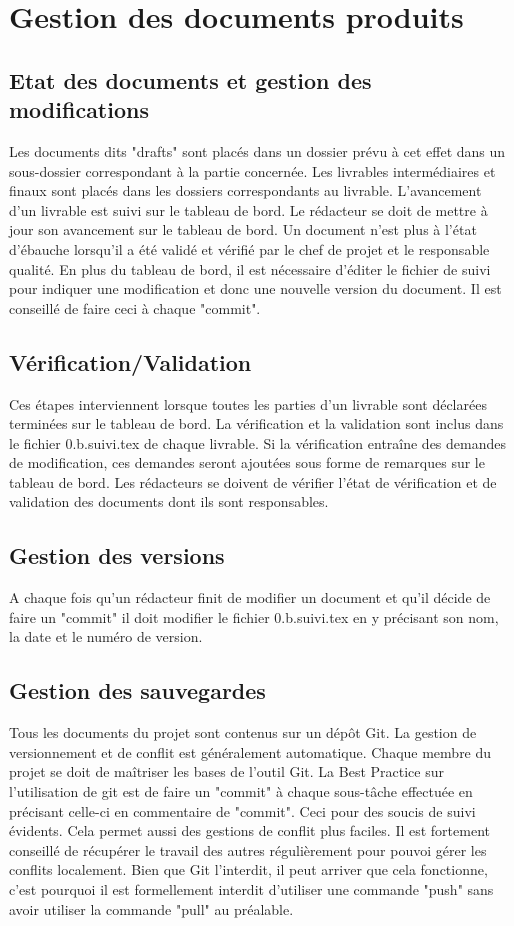\section{Gestion des documents produits}
\subsection{Etat des documents et gestion des modifications}
Les documents dits "drafts" sont placés dans un dossier prévu à cet effet dans
un sous-dossier correspondant à la partie concernée. 
Les livrables intermédiaires et finaux sont placés dans les dossiers 
correspondants au livrable.
L'avancement d'un livrable est suivi sur le tableau de bord. Le rédacteur se
doit de mettre à jour son avancement sur le tableau de bord.
Un document n'est plus à l'état d'ébauche lorsqu'il a été validé et vérifié par 
le chef de projet et le responsable qualité.
En plus du tableau de bord, il est nécessaire d'éditer le fichier de suivi
pour indiquer une modification et donc une nouvelle version du document. Il est
conseillé de faire ceci à chaque "commit".

\subsection{Vérification/Validation}
Ces étapes interviennent lorsque toutes les parties d'un livrable sont 
déclarées terminées sur le tableau de bord.
La vérification et la validation sont inclus dans le fichier 0.b.suivi.tex de 
chaque livrable. Si la vérification entraîne des demandes de modification, 
ces demandes seront ajoutées sous forme de remarques sur le tableau de bord.
Les rédacteurs se doivent de vérifier l'état de vérification et de validation
des documents dont ils sont responsables.

\subsection{Gestion des versions}
A chaque fois qu'un rédacteur finit de modifier un document et qu'il décide 
de faire un "commit" il doit modifier le fichier 0.b.suivi.tex en y précisant 
son nom, la date et le numéro de version.

\subsection{Gestion des sauvegardes}
Tous les documents du projet sont contenus sur un dépôt Git. 
La gestion de versionnement et de conflit est généralement automatique. 
Chaque membre du projet se doit de maîtriser les bases de l'outil Git.
La Best Practice sur l'utilisation de git est de faire un "commit" à chaque 
sous-tâche effectuée en précisant celle-ci en commentaire de "commit". Ceci 
pour des soucis de suivi évidents. Cela permet aussi des gestions de conflit
plus faciles.
Il est fortement conseillé de récupérer le travail des autres régulièrement
pour pouvoi gérer les conflits localement.
Bien que Git l'interdit, il peut arriver que cela fonctionne, c'est pourquoi
il est formellement interdit d'utiliser une commande "push" sans avoir utiliser
la commande "pull" au préalable.

